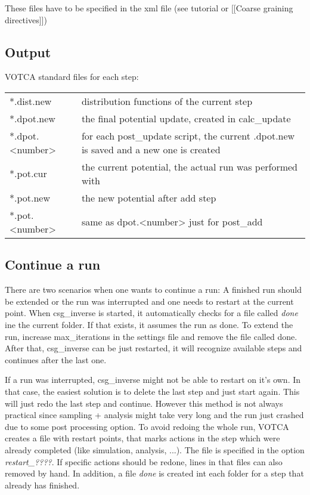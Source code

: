 These files have to be specified in the xml file (see tutorial or [[Coarse graining directives]])

\subsection{Output}
VOTCA standard files for each step:

\begin{tabular}{ll}
*.dist.new & distribution functions of the current step \\
*.dpot.new & the final potential update, created in calc\_update \\
*.dpot.<number> & for each post\_update script, the current .dpot.new is saved and a new one is created\\
*.pot.cur & the current potential, the actual run was performed with \\
*.pot.new & the new potential after add step \\
*.pot.<number> & same as dpot.<number> just for post\_add
\end{tabular}

\subsection{Continue a run}
There are two scenarios when one wants to continue a run: A finished run should be extended or the run was interrupted and one needs to restart at the current point. When csg\_inverse is started, it automatically checks for a file called \textit{done} ine the current folder. If that exists, it assumes the run as done. To extend the run, increase max\_iterations in the settings file and remove the file called done. After that, csg\_inverse can be just restarted, it will recognize available steps and continues after the last one.

If a run was interrupted, csg\_inverse might not be able to restart on it's own. In that case, the easiest solution is to delete the last step and just start again. This will just redo the last step and continue. However this method is not always practical since sampling + analysis might take very long and the run just crashed due to some post processing option. To avoid redoing the whole run, VOTCA creates a file with restart points, that marks actions in the step which were already completed (like simulation, analysis, ...). The file is specified in the option \textit{restart\_????}. If specific actions should be redone, lines in that files can also removed by hand. In addition, a file \textit{done} is created int each folder for a step that already has finished.

